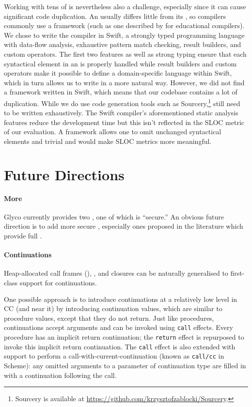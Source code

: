 \documentclass[main.tex]{subfiles}
\begin{document}
Working with tens of  is nevertheless also a challenge, especially since it can cause significant code duplication. An  usually differs little from its , so  compilers commonly use a framework (such as one described by \citet{educomp} for educational compilers). We chose to write the compiler in Swift, a strongly typed programming language with data-flow analysis, exhaustive pattern match checking, result builders, and custom operators. The first two features as well as strong typing ensure that each syntactical element in an  is properly handled while result builders and custom operators make it possible to define a domain-specific language within Swift, which in turn allows us to write  in a more natural way. However, we did not find a  framework written in Swift, which means that our codebase contains a lot of duplication. While we do use code generation tools such as Sourcery,\footnote{Sourcery is available at \url{https://github.com/krzysztofzablocki/Sourcery}.}  still need to be written exhaustively. The Swift compiler's aforementioned static analysis features reduce the development time but this isn't reflected in the SLOC metric of our evaluation. A  framework allows one to omit unchanged syntactical elements and trivial  and would make SLOC metrics more meaningful.

\section{Future Directions}
\paragraph{More } Glyco currently provides two , one of which is \enquote{secure.} An obvious future direction is to add more secure , especially ones proposed in the literature which provide full .

\paragraph{Continuations} Heap-allocated call frames (), , and closures can be naturally generalised to first-class support for continuations.

One possible approach is to introduce continuations at a relatively low level in CC (and  near it) by introducing continuation values, which are similar to procedure values, except that they do not return. Just like procedures, continuations accept arguments and can be invoked using \texttt{call} effects. Every procedure has an implicit return continuation; the \texttt{return} effect is repurposed to invoke this implicit return continuation. The \texttt{call} effect is also extended with support to perform a call-with-current-continuation (known as \texttt{call/cc} in Scheme): any omitted arguments to a parameter of continuation type are filled in with a continuation following the call.
\end{document}
